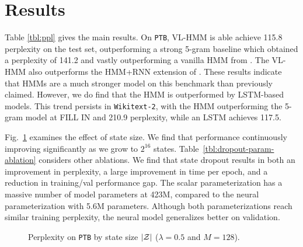 \documentclass[11pt,a4paper]{article}
\begin{document}
\section{Results}
Table \ref{tbl:ppl} gives the main results. On \texttt{PTB}, VL-HMM is able achieve 115.8 perplexity on the test set, outperforming a strong 5-gram baseline which obtained a perplexity of 141.2 and vastly outperforming a vanilla HMM  from \citet{buys2018hmm}.
The VL-HMM also outperforms the HMM+RNN extension of \citet{buys2018hmm}. These results indicate that HMMs are a much stronger model on this benchmark than previously claimed.
However, we do find that the HMM is outperformed by LSTM-based models.
This trend persists in \texttt{Wikitext-2},
with the HMM outperforming the 5-gram model at {\color{red}FILL IN}
and 210.9 perplexity, while an LSTM achieves 117.5.


Fig.~\ref{tbl:states-ablation} examines the effect of state size.
We find that performance continuously improving significantly as we grow to $2^{16}$ states.
Table~\ref{tbl:dropout-param-ablation} considers other ablations.
We find that state dropout results in both an improvement in perplexity,
 a large improvement in time per epoch, and a reduction in training/val performance gap.
The scalar parameterization has a massive number of model parameters at 423M, compared to the
neural parameterization with 5.6M parameters.
Although both parameterizations reach similar training perplexity,
the neural model generalizes better on validation.

\begin{figure}[!t]
\centering
{}
\caption{\label{tbl:states-ablation}
Perplexity on \texttt{PTB} by state size $|\mathcal{Z}|$ ($\lambda =0.5$ and $M=128$).
}
\end{figure}
\end{document}
